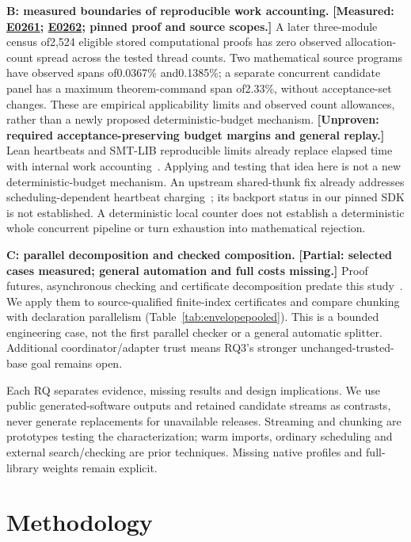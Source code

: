 \documentclass[10pt,twocolumn]{article}
\newcommand{\measured}[1]{\textbf{[Measured: #1]}}
\newcommand{\partialev}[1]{\textbf{[Partial: #1]}}
\newcommand{\unproven}[1]{\textbf{[Unproven: #1]}}
\newcommand{\expref}[2]{\href{https://github.com/yunwei37/proofserve/blob/main/docs/tmp/build-and-evaluate/step-#1/step-report.md}{E#2}}
\begin{document}
\textbf{B: measured boundaries of reproducible work accounting.}
\measured{\expref{0261-20261102T023802+0000}{0261}; \expref{0262-20261102T030442+0000}{0262}; pinned proof and source scopes.}
A later three-module census of2,524 eligible stored computational proofs
has zero observed allocation-count spread across the tested thread counts. Two mathematical source programs
have observed spans of0.0367\% and0.1385\%; a separate concurrent
candidate panel has a maximum theorem-command span of2.33\%, without
acceptance-set changes.
These are empirical applicability limits and observed count allowances,
rather than a newly proposed deterministic-budget mechanism.
\unproven{required acceptance-preserving budget margins and general replay.}
Lean heartbeats and SMT-LIB reproducible limits already replace elapsed time
with internal work accounting~\cite{leanHeartbeats2026,smtlib27}.
Applying and testing that idea here is not a new deterministic-budget
mechanism. An upstream shared-thunk fix already addresses scheduling-dependent
heartbeat charging~\cite{leanSharedThunk2026}; its backport status in our
pinned SDK is not established. A deterministic local counter does not establish a deterministic
whole concurrent pipeline or turn exhaustion into mathematical rejection.

\textbf{C: parallel decomposition and checked composition.}
\partialev{selected cases measured; general automation and full costs missing.}
Proof futures, asynchronous checking and certificate decomposition predate
this study~\cite{wenzelParallel2009,coqAsync2015,selfCertification2012}.
We apply them to source-qualified finite-index certificates and compare
chunking with declaration parallelism (Table~\ref{tab:envelopepooled}).
This is a bounded engineering case, not the first parallel checker or
a general automatic splitter. Additional coordinator/adapter trust means
RQ3's stronger unchanged-trusted-base goal remains open.

Each RQ separates evidence, missing results and design implications.
We use public generated-software outputs and retained candidate streams
as contrasts, never generate replacements for unavailable releases.
Streaming and chunking are prototypes testing the characterization;
warm imports, ordinary scheduling and external search/checking are prior
techniques. Missing native profiles and full-library weights remain explicit.

\section{Methodology}\label{sec:method}
\end{document}
